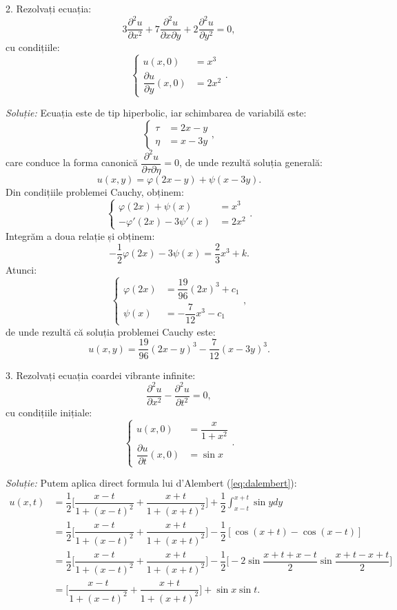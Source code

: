 \vspace{1cm}

2. Rezolvați ecuația:
\[
  3 \dfrac{\partial^2 u}{\partial x^2} + 7 \dfrac{\partial^2 u}{\partial x\partial y} + %
  2 \dfrac{\partial^2 u}{\partial y^2} = 0,
\]
cu condițiile:
\[
  \begin{cases}
    u(x, 0) &= x^3 \\
    \dfrac{\partial u}{\partial y}(x, 0) &= 2x^2
  \end{cases}.
\]

\vspace{1cm}

\emph{Soluție:} Ecuația este de tip hiperbolic, iar schimbarea de variabilă este:
\[
  \begin{cases}
    \tau &= 2x - y \\
    \eta &= x - 3y
  \end{cases},
\]
care conduce la forma canonică $ \dfrac{\partial^2 u}{\partial \tau\partial \eta} = 0 $,
de unde rezultă soluția generală:
\[
  u(x, y) = \varphi(2x - y) + \psi(x - 3y).
\]
Din condițiile problemei Cauchy, obținem:
\[
  \begin{cases}
    \varphi(2x) + \psi(x) &= x^3 \\
    -\varphi'(2x) - 3 \psi'(x) &= 2x^2
  \end{cases}.
\]
Integrăm a doua relație și obținem:
\[
  -\dfrac{1}{2} \varphi(2x) - 3 \psi(x) = \dfrac{2}{3}x^3 + k.
\]
Atunci:
\[
  \begin{cases}
    \varphi(2x) &= \dfrac{19}{96}(2x)^3 + c_1 \\
    \psi(x) &= -\dfrac{7}{12}x^3 - c_1
  \end{cases},
\]
de unde rezultă că soluția problemei Cauchy este:
\[
  u(x, y) = \dfrac{19}{96}(2x - y)^3 - \dfrac{7}{12}(x - 3y)^3.
\]

3. Rezolvați ecuația coardei vibrante infinite:
\[
  \dfrac{\partial^2 u}{\partial x^2} - \dfrac{\partial^2 u}{\partial t^2} = 0,
\]
cu condițiile inițiale:
\[
  \begin{cases}
    u(x, 0) &= \dfrac{x}{1 + x^2} \\
    \dfrac{\partial u}{\partial t}(x, 0) &= \sin x
  \end{cases}.
\]

\vspace{1cm}

\emph{Soluție:} Putem aplica direct formula lui d'Alembert (\ref{eq:dalembert}):
\begin{align*}
  u(x, t) &= \dfrac{1}{2} \Big[ \dfrac{x - t}{1 + (x - t)^2} + \dfrac{x + t}{1 + (x + t)^2} \Big] + %
            \dfrac{1}{2} \int_{x - t}^{x + t} \sin y dy \\
          &= \dfrac{1}{2} \Big[ \dfrac{x - t}{1 + (x - t)^2} + \dfrac{x + t}{1 + (x + t)^2} \Big] - %
            \dfrac{1}{2}[\cos(x + t) - \cos(x - t)] \\
          &= \dfrac{1}{2} \Big[ \dfrac{x - t}{1 + (x - t)^2} + \dfrac{x + t}{1 + (x + t)^2} \Big] - %
            \dfrac{1}{2} \Big[ -2\sin \dfrac{x + t + x - t}{2} \sin \dfrac{x + t - x + t}{2} \Big] \\
          &= \Big[ \dfrac{x - t}{1 + (x - t)^2} + \dfrac{x + t}{1 + (x + t)^2} \Big] + \sin x \sin t.
\end{align*}

